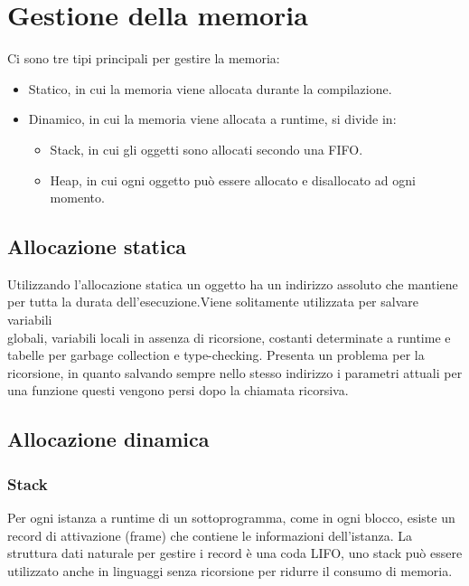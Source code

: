 \chapter{Gestione della memoria}
Ci sono tre tipi principali per gestire la memoria: 
\begin{itemize}
\item Statico, in cui la memoria viene allocata durante la compilazione.
\item Dinamico, in cui la memoria viene allocata a runtime, si divide in:
\begin{itemize}
\item Stack, in cui gli oggetti sono allocati secondo una FIFO.
\item Heap, in cui ogni oggetto pu\`o essere allocato e disallocato ad ogni momento.
\end{itemize}
\end{itemize}
\section{Allocazione statica}
Utilizzando l'allocazione statica un oggetto ha un indirizzo assoluto che mantiene per tutta la durata dell'esecuzione.Viene solitamente utilizzata per salvare variabili \\
globali, variabili locali in assenza di ricorsione, costanti determinate a runtime e tabelle per garbage collection e type-checking. Presenta un problema per la ricorsione, 
in quanto salvando sempre nello stesso indirizzo i parametri attuali per una funzione questi vengono persi dopo la chiamata ricorsiva.
\section{Allocazione dinamica}
\subsection{Stack}
Per ogni istanza a runtime di un sottoprogramma, come in ogni blocco,  esiste un record di attivazione (frame) che contiene le informazioni dell'istanza. La struttura dati
naturale per gestire i record \`e una coda LIFO, uno stack pu\`o essere utilizzato anche in linguaggi senza ricorsione per ridurre il consumo di memoria.
